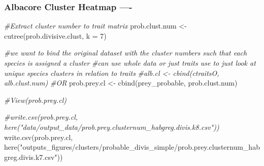\documentclass[
]{article}
\newenvironment{Shaded}{\begin{snugshade}}{\end{snugshade}}
\newcommand{\AttributeTok}[1]{\textcolor[rgb]{0.77,0.63,0.00}{#1}}
\newcommand{\CommentTok}[1]{\textcolor[rgb]{0.56,0.35,0.01}{\textit{#1}}}
\newcommand{\DecValTok}[1]{\textcolor[rgb]{0.00,0.00,0.81}{#1}}
\newcommand{\FunctionTok}[1]{\textcolor[rgb]{0.00,0.00,0.00}{#1}}
\newcommand{\NormalTok}[1]{#1}
\newcommand{\OtherTok}[1]{\textcolor[rgb]{0.56,0.35,0.01}{#1}}
\newcommand{\StringTok}[1]{\textcolor[rgb]{0.31,0.60,0.02}{#1}}
\begin{document}
\hypertarget{albacore-cluster-heatmap--}{%
\subsubsection{Albacore Cluster Heatmap
----}\label{albacore-cluster-heatmap--}}

\begin{Shaded}
\begin{Highlighting}[]
\CommentTok{\#Extract cluster number to trait matrix}
\NormalTok{prob.clust.num }\OtherTok{\textless{}{-}} \FunctionTok{cutree}\NormalTok{(prob.divisive.clust, }\AttributeTok{k =} \DecValTok{7}\NormalTok{)}

\CommentTok{\#we want to bind the original dataset with the cluster numbers such that each species is assigned a cluster}
\CommentTok{\#can use whole data or just traits use to just look at unique species clusters in relation to traits}
\CommentTok{\#alb.cl \textless{}{-} cbind(ctraitsO, alb.clust.num)}
\CommentTok{\#OR}
\NormalTok{prob.prey.cl }\OtherTok{\textless{}{-}} \FunctionTok{cbind}\NormalTok{(prey\_probable, prob.clust.num)}

\CommentTok{\#View(prob.prey.cl)}

\CommentTok{\#write.csv(prob.prey.cl, here("data/output\_data/prob.prey.clusternum\_habgreg.divis.k8.csv"))}
\FunctionTok{write.csv}\NormalTok{(prob.prey.cl, }\FunctionTok{here}\NormalTok{(}\StringTok{"outputs\_figures/clusters/probable\_divis\_simple/prob.prey.clusternum\_habgreg.divis.k7.csv"}\NormalTok{))}
\end{Highlighting}
\end{Shaded}
\end{document}
